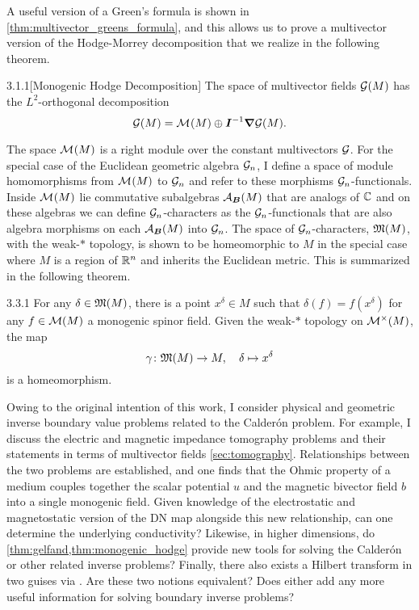 A useful version of a Green's formula is shown in \cref{thm:multivector_greens_formula}, and this allows us to prove a multivector version of the Hodge-Morrey decomposition that we realize in the following theorem.
\begin{customthm}{3.1.1}[Monogenic Hodge Decomposition]
The space of multivector fields $\mathcal{G}(M)$ has the $L^2$-orthogonal decomposition
\begin{equation}
\mathcal{G}(M) = \mathcal{M}^{}(M) \oplus \boldsymbol{I}^{-1} \boldsymbol{\nabla} \mathcal{G}(M).
\end{equation}
\end{customthm}

The space $\mathcal{M}^{}(M)$ is a right module over the constant multivectors $\mathcal{G}$. For the special case of the Euclidean geometric algebra $\mathcal{G}_n$, I define a space of module homomorphisms from $\mathcal{M}^{}(M)$ to $\mathcal{G}_n$ and refer to these morphisms $\mathcal{G}_n$-functionals. Inside $\mathcal{M}^{}(M)$ lie commutative subalgebras $\mathcal{A}_{\boldsymbol{B}}(M)$ that are analogs of $\mathbb{C}$ and on these algebras we can define $\mathcal{G}_n$-characters as the $\mathcal{G}_n$-functionals that are also algebra morphisms on each $\mathcal{A}_{\boldsymbol{B}}(M)$ into $\mathcal{G}_n$. The space of $\mathcal{G}_n$-characters, $\mathfrak{M}(M)$, with the weak-$\ast$ topology, is shown to be homeomorphic to $M$ in the special case where $M$ is a region of $\mathbb{R}^n$ and inherits the Euclidean metric. This is summarized in the following theorem.
\begin{customthm}{3.3.1}
For any $\delta \in \mathfrak{M}(M)$, there is a point $x^\delta \in M$ such that $\delta(f) = f(x^\delta)$ for any $f\in \mathcal{M}(M)$ a monogenic spinor field. Given the weak-$\ast$ topology on $\mathcal{M}^\times(M)$, the map
\[
\gamma \colon \mathfrak{M}(M) \to M, \quad \delta \mapsto x^\delta
\]
is a homeomorphism. 
\end{customthm}

Owing to the original intention of this work, I consider physical and geometric inverse boundary value problems related to the Calder\'on problem. For example, I discuss the electric and magnetic impedance tomography problems and their statements in terms of multivector fields \cref{sec:tomography}. Relationships between the two problems are established, and one finds that the Ohmic property of a medium couples together the scalar potential $u$ and the magnetic bivector field $b$ into a single monogenic field. Given knowledge of the electrostatic and magnetostatic version of the DN map alongside this new relationship, can one determine the underlying conductivity? Likewise, in higher dimensions, do \cref{thm:gelfand,thm:monogenic_hodge} provide new tools for solving the Calder\'on or other related inverse problems? Finally, there also exists a Hilbert transform in two guises via \cite{belishev_dirichlet_2008,brackx_hilbert_2008}. Are these two notions equivalent? Does either add any more useful information for solving boundary inverse problems?
